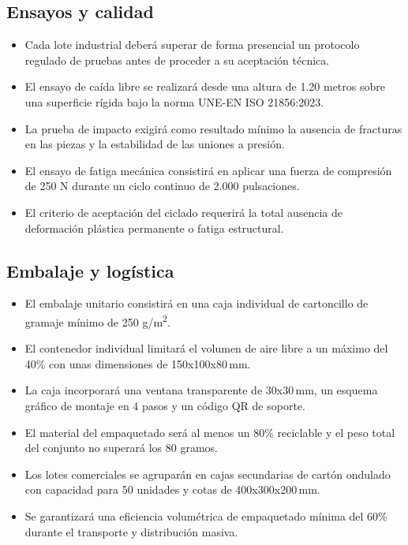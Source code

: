 \documentclass[11pt,a4paper]{article}
\begin{document}
\subsection{Ensayos y calidad}
\begin{itemize}
    \item Cada lote industrial deberá superar de forma presencial un protocolo regulado de pruebas antes de proceder a su aceptación técnica.
    \item El ensayo de caída libre se realizará desde una altura de 1.20 metros sobre una superficie rígida bajo la norma UNE-EN ISO 21856:2023.
    \item La prueba de impacto exigirá como resultado mínimo la ausencia de fracturas en las piezas y la estabilidad de las uniones a presión.
    \item El ensayo de fatiga mecánica consistirá en aplicar una fuerza de compresión de 250 N durante un ciclo continuo de 2.000 pulsaciones.
    \item El criterio de aceptación del ciclado requerirá la total ausencia de deformación plástica permanente o fatiga estructural.
\end{itemize}

\subsection{Embalaje y logística}
\begin{itemize}
    \item El embalaje unitario consistirá en una caja individual de cartoncillo de gramaje mínimo de 250 g/m\textsuperscript{2}.
    \item El contenedor individual limitará el volumen de aire libre a un máximo del 40\% con unas dimensiones de 150x100x80\,mm.
    \item La caja incorporará una ventana transparente de 30x30\,mm, un esquema gráfico de montaje en 4 pasos y un código QR de soporte.
    \item El material del empaquetado será al menos un 80\% reciclable y el peso total del conjunto no superará los 80 gramos.
    \item Los lotes comerciales se agruparán en cajas secundarias de cartón ondulado con capacidad para 50 unidades y cotas de 400x300x200\,mm.
    \item Se garantizará una eficiencia volumétrica de empaquetado mínima del 60\% durante el transporte y distribución masiva.
\end{itemize}
\end{document}

